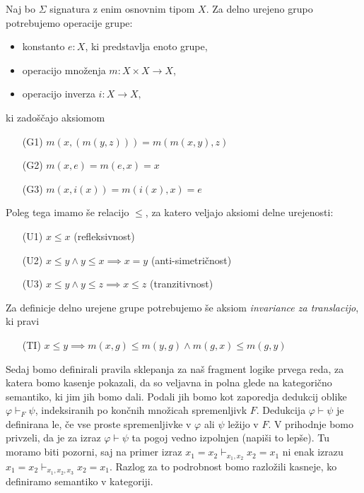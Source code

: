 \documentclass[../kategoricna_logika.tex]{subfiles}
\begin{document}
\begin{primer}
  Naj bo $\Sigma$ signatura z enim osnovnim tipom $X$. Za delno urejeno grupo potrebujemo operacije grupe:
  \begin{itemize}
    \item konstanto $e : X$, ki predstavlja enoto grupe,
    \item operacijo množenja $m : X \times X \to X$,
    \item operacijo inverza $i : X \to X,$
  \end{itemize}
  ki zadoščajo aksiomom
  \begin{itemize}
    \item[(G1)] $m(x,(m(y,z))) = m(m(x,y), z)$
    \item[(G2)] $m(x,e) = m(e,x) = x$
    \item[(G3)] $m(x,i(x)) = m(i(x), x) = e$
  \end{itemize}
  Poleg tega imamo še relacijo $\leq$, za katero veljajo aksiomi delne urejenosti:
  \begin{itemize}
    \item[(U1)] $x \leq x$ (refleksivnost)
    \item[(U2)] $x \leq y \wedge y \leq x \implies x = y$ (anti-simetričnost)
    \item[(U3)] $x \leq y \wedge y \leq z \implies x \leq z$ (tranzitivnost)
  \end{itemize}
  Za definicje delno urejene grupe potrebujemo še aksiom \emph{invariance za translacijo}, ki pravi
  \begin{itemize}
    \item[(TI)] $x \leq y \implies m(x, g) \leq m(y, g) \wedge m(g,x) \leq m(g,y)$
  \end{itemize}
\end{primer}

Sedaj bomo definirali pravila sklepanja za naš fragment logike prvega reda, 
za katera bomo kasenje pokazali, da so veljavna in polna glede na kategorično semantiko, ki jim jih bomo dali.
Podali jih bomo kot zaporedja dedukcij oblike $\varphi \vdash_F \psi$, indeksiranih po končnih množicah spremenljivk $F$. Dedukcija $\varphi \vdash \psi$ je definirana le, če vse proste spremenljivke v $\varphi$ ali $\psi$ ležijo v $F$. V prihodnje bomo privzeli, da je za izraz $\varphi \vdash \psi$ ta pogoj vedno izpolnjen (napiši to lepše).
Tu moramo biti pozorni, saj na primer izraz $x_1 = x_2 \vdash_{x_1, x_2} x_2 = x_1$ ni enak izrazu $x_1 = x_2 \vdash_{x_1, x_2, x_3} x_2 = x_1$. Razlog za to podrobnost bomo razložili kasneje, ko definiramo semantiko v kategoriji.
\end{document}
